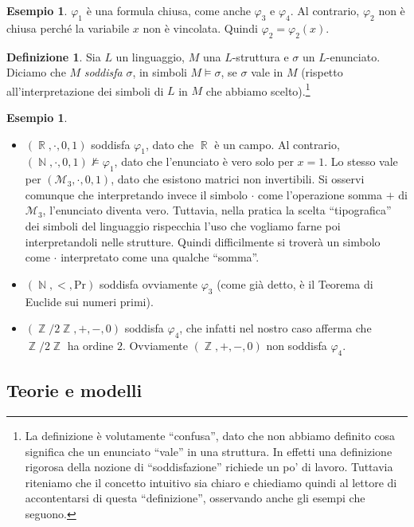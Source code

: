 \documentclass[12pt,a4paper]{report}
\theoremstyle{definition}
\newtheorem{defn}[teo]{Definizione}  %
\newtheorem{es}[teo]{Esempio}  %
\theoremstyle{num.custom-title}
\DeclareMathOperator{\N}{\mathbb{N}}
\DeclareMathOperator{\R}{\mathbb{R}}
\DeclareMathOperator{\Z}{\mathbb{Z}}
\renewcommand{\phi}{\varphi}
\begin{document}
\begin{es}
$\phi_1$ è una formula chiusa, come anche $\phi_3$ e $\phi_4$. Al contrario, $\phi_2$ non è chiusa perché la variabile $x$ non è vincolata. Quindi $\phi_2 = \phi_2(x)$.
\end{es}

\begin{defn}
Sia $L$ un linguaggio, $M$ una $L$-struttura e $\sigma$ un $L$-enunciato. Diciamo che $M$ \emph{soddisfa} $\sigma$, in simboli $M \models \sigma$, se $\sigma$ vale in $M$ (rispetto all'interpretazione dei simboli di $L$ in $M$ che abbiamo scelto).\footnote{La definizione è volutamente ``confusa'', dato che non abbiamo definito cosa significa che un enunciato ``vale'' in una struttura. In effetti una definizione rigorosa della nozione di ``soddisfazione'' richiede un po' di lavoro. Tuttavia riteniamo che il concetto intuitivo sia chiaro e chiediamo quindi al lettore di accontentarsi di questa ``definizione'', osservando anche gli esempi che seguono.}
\end{defn}

\begin{es}\
\begin{itemize}
\item $(\R,\cdot,0,1)$ soddisfa $\phi_1$, dato che $\R$ è un campo. Al contrario, $(\N,\cdot,0,1) \not\models \phi_1$, dato che l'enunciato è vero solo per $x=1$. Lo stesso vale per $(\mathcal{M}_3,\cdot,0,1)$, dato che esistono matrici non invertibili. Si osservi comunque che interpretando invece il simbolo $\cdot$ come l'operazione somma $+$ di $\mathcal{M}_3$, l'enunciato diventa vero. Tuttavia, nella pratica la scelta ``tipografica'' dei simboli del linguaggio rispecchia l'uso che vogliamo farne poi interpretandoli nelle strutture. Quindi difficilmente si troverà un simbolo come $\cdot$ interpretato come una qualche ``somma''.
\item $(\N,<,\text{Pr})$ soddisfa ovviamente $\phi_3$ (come già detto, è il Teorema di Euclide sui numeri primi).
\item $(\Z/2\Z,+,-,0)$ soddisfa $\phi_4$, che infatti nel nostro caso afferma che $\Z/2\Z$ ha ordine $2$. Ovviamente $(\Z,+,-,0)$ non soddisfa $\phi_4$.
\end{itemize}
\end{es}


\subsection{Teorie e modelli}
\end{document}
